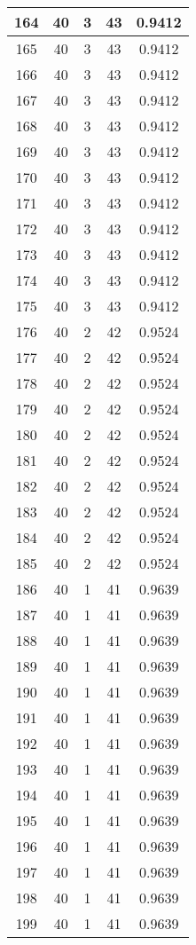 \documentclass[letterpaper, 12pt]{article}
\begin{document}
\begin{longtable}{|c|c|c|c|c|}
\hline
164 & 40 & 3 & 43 & 0.9412 \\
\hline
165 & 40 & 3 & 43 & 0.9412 \\
\hline
166 & 40 & 3 & 43 & 0.9412 \\
\hline
167 & 40 & 3 & 43 & 0.9412 \\
\hline
168 & 40 & 3 & 43 & 0.9412 \\
\hline
169 & 40 & 3 & 43 & 0.9412 \\
\hline
170 & 40 & 3 & 43 & 0.9412 \\
\hline
171 & 40 & 3 & 43 & 0.9412 \\
\hline
172 & 40 & 3 & 43 & 0.9412 \\
\hline
173 & 40 & 3 & 43 & 0.9412 \\
\hline
174 & 40 & 3 & 43 & 0.9412 \\
\hline
175 & 40 & 3 & 43 & 0.9412 \\
\hline
176 & 40 & 2 & 42 & 0.9524 \\
\hline
177 & 40 & 2 & 42 & 0.9524 \\
\hline
178 & 40 & 2 & 42 & 0.9524 \\
\hline
179 & 40 & 2 & 42 & 0.9524 \\
\hline
180 & 40 & 2 & 42 & 0.9524 \\
\hline
181 & 40 & 2 & 42 & 0.9524 \\
\hline
182 & 40 & 2 & 42 & 0.9524 \\
\hline
183 & 40 & 2 & 42 & 0.9524 \\
\hline
184 & 40 & 2 & 42 & 0.9524 \\
\hline
185 & 40 & 2 & 42 & 0.9524 \\
\hline
186 & 40 & 1 & 41 & 0.9639 \\
\hline
187 & 40 & 1 & 41 & 0.9639 \\
\hline
188 & 40 & 1 & 41 & 0.9639 \\
\hline
189 & 40 & 1 & 41 & 0.9639 \\
\hline
190 & 40 & 1 & 41 & 0.9639 \\
\hline
191 & 40 & 1 & 41 & 0.9639 \\
\hline
192 & 40 & 1 & 41 & 0.9639 \\
\hline
193 & 40 & 1 & 41 & 0.9639 \\
\hline
194 & 40 & 1 & 41 & 0.9639 \\
\hline
195 & 40 & 1 & 41 & 0.9639 \\
\hline
196 & 40 & 1 & 41 & 0.9639 \\
\hline
197 & 40 & 1 & 41 & 0.9639 \\
\hline
198 & 40 & 1 & 41 & 0.9639 \\
\hline
199 & 40 & 1 & 41 & 0.9639 \\
\hline
\end{longtable}
\end{document}
